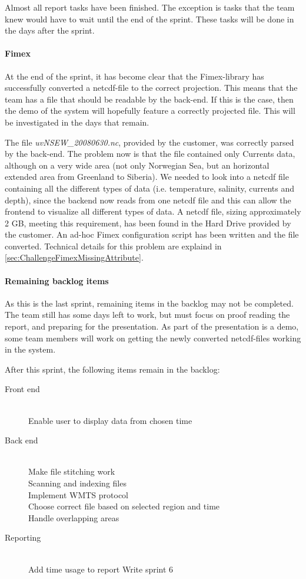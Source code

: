 \documentclass[11pt,a4paper,titlepage,oneside]{report}
\begin{document}
Almost all report tasks have been finished. The exception is tasks that the team knew would have to wait until the end of the sprint. These tasks will be done in the days after the sprint.

\paragraph{Fimex}
At the end of the sprint, it has become clear that the \gls{Fimex}-library has successfully converted a \gls{netcdf}-file to the correct projection. This means that the team has a file that should be readable by the \gls{back-end}. If this is the case, then the demo of the system will hopefully feature a correctly projected file. This will be investigated in the days that remain.

The file \textit{uvNSEW\_20080630.nc}, provided by the customer, was correctly parsed by the back-end. The problem now is that the file contained only Currents data, although on a very wide area (not only Norwegian Sea, but an horizontal extended area from Greenland to Siberia).
We needed to look into a \gls{netcdf} file containing all the different types of data (i.e. temperature, salinity, currents and depth), since the backend now reads from one \gls{netcdf} file and this can allow the frontend to visualize all different types of data.
A \gls{netcdf} file, sizing approximately 2 GB, meeting this requirement, has been found in the Hard Drive provided by the customer. An ad-hoc Fimex configuration script has been written and the file converted.
Technical details for this problem are explaind in \ref{sec:ChallengeFimexMissingAttribute}.

\paragraph{Remaining backlog items}
As this is the last sprint, remaining items in the backlog may not be completed. The team still has some days left to work, but must focus on proof reading the report, and preparing for the presentation. As part of the presentation is a demo, some team members will work on getting the newly converted \gls{netcdf}-files working in the system. 

After this sprint, the following items remain in the backlog:

\begin{description}
	\item[Front end] \hfill \\
	Enable user to display data from chosen time
	\item[Back end] \hfill \\
	Make file stitching work \hfill \\
	Scanning and indexing files \hfill \\
	Implement \gls{WMTS} \gls{protocol} \hfill \\
	Choose correct file based on selected region and time \hfill \\
	Handle overlapping areas
	\item[Reporting] \hfill \\
	Add time usage to report
	Write sprint 6
\end{description}
\end{document}
